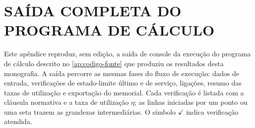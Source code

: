 
\chapter{SAÍDA COMPLETA DO PROGRAMA DE CÁLCULO}\label{ap:saida-pipeline}

Este apêndice reproduz, sem edição, a saída de console da execução do programa
de cálculo descrito no \autoref{ap:codigo-fonte} que produziu os resultados
desta monografia. A saída percorre as mesmas fases do fluxo de execução: dados
de entrada, verificações de estado-limite último e de serviço, ligações,
resumo das taxas de utilização e exportação do memorial. Cada verificação é
listada com a cláusula normativa e a taxa de utilização $\eta$; as linhas
iniciadas por um ponto ou uma seta trazem as grandezas intermediárias. O
símbolo $\checkmark$ indica verificação atendida.


